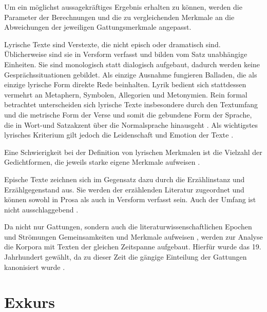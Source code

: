 \documentclass[a4paper,10p]{article}
\begin{document}
Um ein möglichst aussagekräftiges Ergebnis erhalten zu können, werden die Parameter der Berechnungen und die zu vergleichenden Merkmale an die Abweichungen der jeweiligen Gattungsmerkmale angepasst. \par 

Lyrische Texte sind Verstexte, die nicht episch oder dramatisch sind. Üblicherweise sind sie in Versform verfasst und bilden vom Satz unabhängige Einheiten. Sie sind monologisch statt dialogisch aufgebaut, dadurch werden keine Gesprächssituationen gebildet. Als einzige Ausnahme fungieren Balladen, die als einzige lyrische Form direkte Rede beinhalten. Lyrik bedient sich stattdessen vermehrt an Metaphern, Symbolen, Allegorien und Metonymien. Rein formal betrachtet unterscheiden sich lyrische Texte insbesondere durch den Textumfang und die metrische Form der Verse und somit die gebundene Form der Sprache, die in Wort-und Satzakzent über die Normalsprache hinausgeht \citep[vgl.][S. 111]{Krah2006}. Als wichtigstes lyrisches Kriterium gilt jedoch die Leidenschaft und Emotion der Texte \citep[vgl.][S. 462-464]{SchweikleGunther;Burdorf2007}. \par 

Eine Schwierigkeit bei der Definition von lyrischen Merkmalen ist die Vielzahl der Gedichtformen, die jeweils starke eigene Merkmale aufweisen \citep[vgl.][S. 119]{Krah2006}. \par 

Epische Texte zeichnen sich im Gegensatz dazu durch die Erzählinstanz und Erzählge\-gen\-stand aus. Sie werden der erzählenden Literatur zugeordnet und können sowohl in Prosa als auch in Versform verfasst sein. Auch der Umfang ist nicht ausschlaggebend \citep[vgl.][S. 195]{SchweikleGunther;Burdorf2007}. \par 


Da nicht nur Gattungen, sondern auch die literaturwissenschaftlichen Epochen und Strömungen Gemeinsamkeiten und Merkmale aufweisen \citep[vgl.][S. 274]{Krah2006}, werden zur Analyse die Korpora mit Texten der gleichen Zeitspanne aufgebaut. Hierfür wurde das 19. Jahrhundert gewählt, da zu dieser Zeit die gängige Einteilung der Gattungen kanonisiert wurde \citep[vgl.][S. 368]{Krah2006}.


\section{Exkurs}
\end{document}
